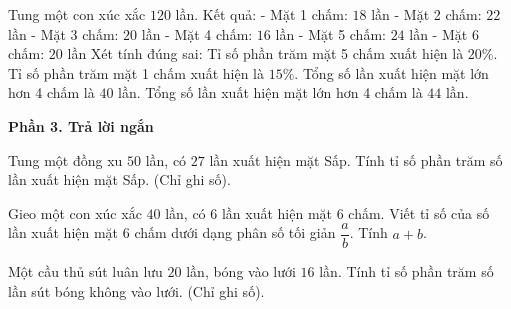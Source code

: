 \begin{ex} %
Tung một con xúc xắc $120$ lần. Kết quả:
- Mặt 1 chấm: $18$ lần
- Mặt 2 chấm: $22$ lần
- Mặt 3 chấm: $20$ lần
- Mặt 4 chấm: $16$ lần
- Mặt 5 chấm: $24$ lần
- Mặt 6 chấm: $20$ lần
Xét tính đúng sai:
\choiceTF
{\True Tỉ số phần trăm mặt 5 chấm xuất hiện là $20\%$.}
{\True Tỉ số phần trăm mặt 1 chấm xuất hiện là $15\%$.}
{Tổng số lần xuất hiện mặt lớn hơn 4 chấm là $40$ lần.}
{\True Tổng số lần xuất hiện mặt lớn hơn 4 chấm là $44$ lần.}
\end{ex}

\textbf{Phần 3. Trả lời ngắn}

\begin{ex} %
Tung một đồng xu $50$ lần, có $27$ lần xuất hiện mặt Sấp. Tính tỉ số phần trăm số lần xuất hiện mặt Sấp. (Chỉ ghi số).
\end{ex}

\begin{ex} %
Gieo một con xúc xắc $40$ lần, có $6$ lần xuất hiện mặt 6 chấm. Viết tỉ số của số lần xuất hiện mặt 6 chấm dưới dạng phân số tối giản $\dfrac{a}{b}$. Tính $a + b$.
\end{ex}

\begin{ex} %
Một cầu thủ sút luân lưu $20$ lần, bóng vào lưới $16$ lần. Tính tỉ số phần trăm số lần sút bóng không vào lưới. (Chỉ ghi số).
\end{ex}

